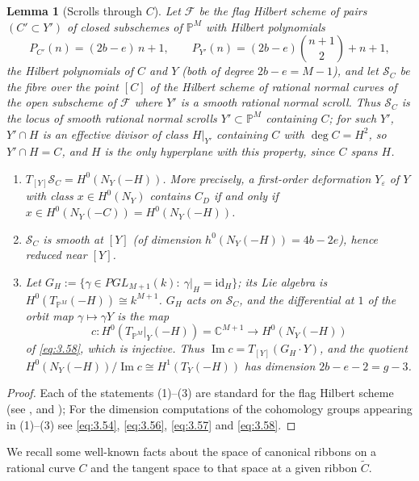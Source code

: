 \documentclass[11pt,reqno]{amsart}
\theoremstyle{plain}
\newtheorem{lemma}[theorem]{Lemma}
\theoremstyle{definition}
\newcommand{\PM}{\mathbb{P}^M}
\renewcommand{\Im}{\operatorname{Im}}
\newcommand{\id}{\mathrm{id}}
\newcommand{\NY}{N_{Y}}
\newcommand{\TP}{T_{\PM}|_Y}
\newcommand{\SC}{\mathcal{S}_C}
\newcommand{\GH}{G_H}
\newcommand{\Dd}{D}
\begin{document}

\begin{lemma}[Scrolls through $C$]\label{lem:SC}
Let $\mathcal F$ be the flag Hilbert scheme of pairs $(C'\subset Y')$ of closed subschemes of $\PM$ with Hilbert polynomials
\[
P_{C'}(n)=(2b-e)\,n+1,\qquad P_{Y'}(n)=(2b-e)\binom{n+1}{2}+n+1,
\]
the Hilbert polynomials of $C$ and $Y$ (both of degree $2b-e=M-1$), and let $\SC$ be the fibre over the point $[C]$ of the Hilbert scheme of rational normal curves of the open subscheme of $\mathcal F$ where $Y'$ is a smooth rational normal scroll. Thus $\SC$ is the locus of smooth rational normal scrolls $Y'\subset\PM$ containing $C$; for such $Y'$, $Y'\cap H$ is an effective divisor of class $H|_{Y'}$ containing $C$ with $\deg C=H^2$, so $Y'\cap H=C$, and $H$ is the only hyperplane with this property, since $C$ spans $H$.
\begin{enumerate}
\item $T_{[Y]}\SC=H^0(\NY(-H))$. More precisely, a first-order deformation $Y_\varepsilon$ of $Y$ with class $x\in H^0(\NY)$ contains $C_\Dd$ if and only if $x\in H^0(\NY(-C))=H^0(\NY(-H))$.
\item $\SC$ is smooth at $[Y]$ (of dimension $h^0(\NY(-H))=4b-2e$), hence reduced near $[Y]$.
\item Let $\GH:=\{\gamma\in PGL_{M+1}(k):\ \gamma|_H=\id_H\}$; its Lie algebra is $H^0(T_{\PM}(-H))\cong k^{M+1}$. $\GH$ acts on $\SC$, and the differential at $1$ of the orbit map $\gamma\mapsto\gamma Y$ is the map
\[
c\colon H^0(\TP(-H))=\mathbb{C}^{M+1}\longrightarrow H^0(\NY(-H))
\]
of \eqref{eq:3.58}, which is injective. Thus $\Im c=T_{[Y]}(\GH\cdot Y)$, and the quotient $H^0(\NY(-H))/\Im c\cong H^1(T_Y(-H))$ has dimension $2b-e-2=g-3$.
\end{enumerate}
\end{lemma}

\begin{proof}
Each of the statements (1)--(3) are standard for the flag Hilbert scheme (see \cite{Kle81}, \cite[\S4.5]{Ser06} and \cite{CLM93}); For the dimension computations of the cohomology groups appearing in (1)--(3) see \eqref{eq:3.54}, \eqref{eq:3.56}, \eqref{eq:3.57} and \eqref{eq:3.58}.    
\end{proof}


We recall some well-known facts about the space of canonical ribbons on a rational curve $C$ and the tangent space to that space at a given ribbon $\widetilde{C}$.
\end{document}
